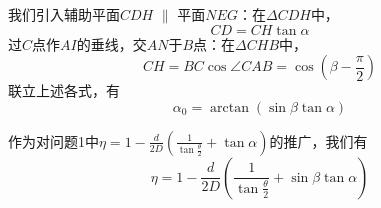 \documentclass{cumcmthesis}
\begin{document}
我们引入辅助平面$CDH$ $\parallel$ 平面$NEG$：在$\Delta CDH$中，
\begin{equation}
CD = CH\tan\alpha
\label{eq:eq2-2}
\end{equation}
过$C$点作$AI$的垂线，交$AN$于$B$点：在$\Delta CHB$中，
\begin{equation}
CH = BC \cos\angle CAB = \cos(\beta-\frac{\pi}{2})
\label{eq:eq2-3}
\end{equation}
联立上述各式，有
\begin{equation}
\alpha_0 = \arctan (\sin\beta \tan\alpha)
\label{eq:eq2-4}
\end{equation}

作为对问题1中$\eta = 1 - \frac{d}{2D}(\frac{1}{\tan \frac{\theta}{2}}+\tan \alpha)$的推广，我们有
\begin{equation}
\eta = 1 - \frac{d}{2D}(\frac{1}{\tan \frac{\theta}{2}}+\sin\beta \tan\alpha)
\label{q:eq2-4}
\end{equation}
\end{document}
